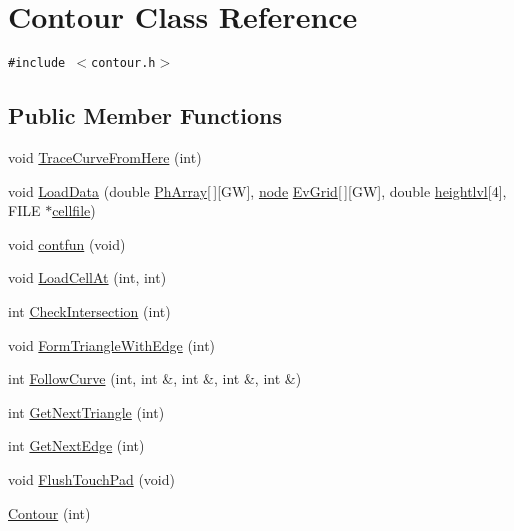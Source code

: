 \hypertarget{classContour}{
\section{Contour Class Reference}
\label{classContour}
}
{\tt \#include $<$contour.h$>$}

\subsection*{Public Member Functions}
\begin{CompactItemize}
\item 
void \hyperlink{classContour_a0}{Trace\-Curve\-From\-Here} (int)
\item 
void \hyperlink{classContour_a1}{Load\-Data} (double \hyperlink{classContour_o13}{Ph\-Array}\mbox{[}$\,$\mbox{]}\mbox{[}GW\mbox{]}, \hyperlink{structnode}{node} \hyperlink{classContour_o14}{Ev\-Grid}\mbox{[}$\,$\mbox{]}\mbox{[}GW\mbox{]}, double \hyperlink{classContour_o15}{heightlvl}\mbox{[}4\mbox{]}, FILE $\ast$\hyperlink{classContour_o20}{cellfile})
\item 
void \hyperlink{classContour_a2}{contfun} (void)
\item 
void \hyperlink{classContour_a3}{Load\-Cell\-At} (int, int)
\item 
int \hyperlink{classContour_a4}{Check\-Intersection} (int)
\item 
void \hyperlink{classContour_a5}{Form\-Triangle\-With\-Edge} (int)
\item 
int \hyperlink{classContour_a6}{Follow\-Curve} (int, int \&, int \&, int \&, int \&)
\item 
int \hyperlink{classContour_a7}{Get\-Next\-Triangle} (int)
\item 
int \hyperlink{classContour_a8}{Get\-Next\-Edge} (int)
\item 
void \hyperlink{classContour_a9}{Flush\-Touch\-Pad} (void)
\item 
\hyperlink{classContour_a10}{Contour} (int)
\end{CompactItemize}
